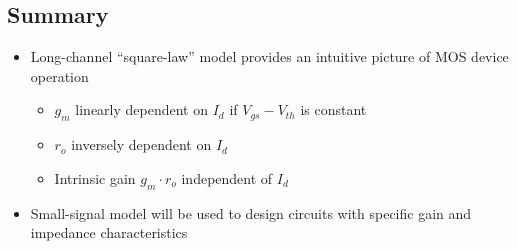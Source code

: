 \documentclass[11pt]{article}
\providecommand{\tightlist}{%
      \setlength{\itemsep}{0pt}\setlength{\parskip}{0pt}}
\begin{document}
    \hypertarget{summary}{%
\subsection{Summary}\label{summary}}

    \begin{itemize}
\tightlist
\item
  Long-channel ``square-law'' model provides an intuitive picture of MOS
  device operation

  \begin{itemize}
  \tightlist
  \item
    \(g_m\) linearly dependent on \(I_d\) if \(V_{gs} - V_{th}\) is
    constant
  \item
    \(r_o\) inversely dependent on \(I_d\)
  \item
    Intrinsic gain \(g_m \cdot r_o\) independent of \(I_d\)
  \end{itemize}
\item
  Small-signal model will be used to design circuits with specific gain
  and impedance characteristics
\end{itemize}


    
    
    
\end{document}
